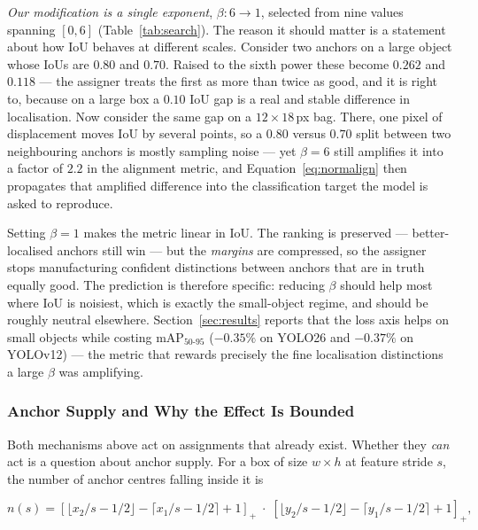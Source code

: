 \documentclass[10pt,twocolumn,a4paper]{article}
\begin{document}
\emph{Our modification is a single exponent}, $\beta: 6 \rightarrow 1$, selected from
nine values spanning $[0,6]$ (Table~\ref{tab:search}). The
reason it should matter is a statement about how IoU behaves at different
scales. Consider two anchors on a large object whose IoUs are $0.80$ and $0.70$.
Raised to the sixth power these become $0.262$ and $0.118$ --- the assigner
treats the first as more than twice as good, and it is right to, because on a
large box a $0.10$ IoU gap is a real and stable difference in localisation.
Now consider the same gap on a $12\times18$\,px bag. There, one pixel of
displacement moves IoU by several points, so a $0.80$ versus $0.70$ split
between two neighbouring anchors is mostly sampling noise --- yet $\beta=6$
still amplifies it into a factor of $2.2$ in the alignment metric, and
Equation~\eqref{eq:normalign} then propagates that amplified difference into the
classification target the model is asked to reproduce.

Setting $\beta=1$ makes the metric linear in IoU. The ranking is preserved ---
better-localised anchors still win --- but the \emph{margins} are compressed, so
the assigner stops manufacturing confident distinctions between anchors that are
in truth equally good. The prediction is therefore specific: reducing $\beta$
should help most where IoU is noisiest, which is exactly the small-object regime,
and should be roughly neutral elsewhere. Section~\ref{sec:results} reports that
the loss axis helps on small objects while costing mAP$_{50\text{-}95}$
($-0.35\%$ on YOLO26 and $-0.37\%$ on YOLOv12) --- the metric that rewards
precisely the fine localisation distinctions a large $\beta$ was amplifying.

\subsubsection{Anchor Supply and Why the Effect Is Bounded}

Both mechanisms above act on assignments that already exist. Whether they
\emph{can} act is a question about anchor supply. For a box of size $w \times h$
at feature stride $s$, the number of anchor centres falling inside it is

\begin{equation}
n(s) = \left[ \lfloor x_2/s - 1/2 \rfloor - \lceil x_1/s - 1/2 \rceil + 1 \right]_+
\;\cdot\;
\left[ \lfloor y_2/s - 1/2 \rfloor - \lceil y_1/s - 1/2 \rceil + 1 \right]_+ ,
\label{eq:footprint}
\end{equation}
\end{document}
